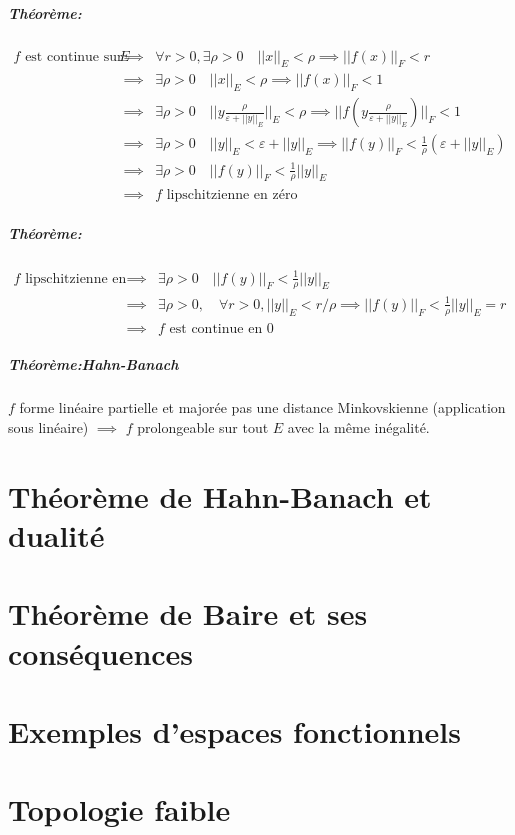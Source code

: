 \documentclass[a4paper, 11pt, french]{book}
\theoremstyle{plain} %
\theoremstyle{definition} %
\theoremstyle{remark} %
\newcommand{\1}{\mathds{1}}
\begin{document}
\paragraph{Théorème:}
$
\begin{array}{rcl}
	\text{$f$ est continue sur tout $E$}
	&\implies &\forall r > 0, \exists\rho > 0\quad ||x||_E <\rho\implies ||f(x)||_F < r\\
	&\implies &\exists\rho > 0\quad ||x||_E <\rho\implies ||f(x)||_F < 1\\
	&\implies &\exists\rho > 0\quad ||y\frac{\rho}{\varepsilon + ||y||_E}||_E <\rho\implies ||f(y\frac{\rho}{\varepsilon + ||y||_E})||_F < 1\\
	&\implies &\exists\rho > 0\quad ||y||_E <\varepsilon + ||y||_E\implies ||f(y)||_F <\frac{1}{\rho}(\varepsilon + ||y||_E)\\
	&\implies &\exists\rho > 0\quad ||f(y)||_F <\frac{1}{\rho}||y||_E\\
	&\implies &\text{$f$ lipschitzienne en zéro}
\end{array}
$

\paragraph{Théorème:}
$
\begin{array}{rcl}
	\text{$f$ lipschitzienne en zéro}
	&\implies &\exists\rho > 0\quad ||f(y)||_F <\frac{1}{\rho}||y||_E\\
	&\implies &\exists\rho > 0, \quad\forall r > 0, ||y||_E < r/\rho\implies ||f(y)||_F <\frac{1}{\rho}||y||_E=r\\
	&\implies &\text{$f$ est continue en $0$}
\end{array}
$

\paragraph{Théorème:Hahn-Banach} $f$ forme linéaire partielle et majorée pas une distance Minkovskienne (application sous linéaire) $\implies$ $f$ prolongeable sur tout $E$ avec la même inégalité.

\chapter{Théorème de Hahn-Banach et dualité}

\chapter{Théorème de Baire et ses conséquences}

\chapter{Exemples d'espaces fonctionnels}

\chapter{Topologie faible}
\end{document}
